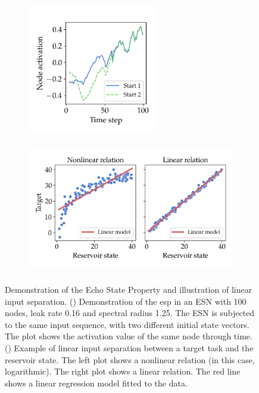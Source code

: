 \begin{figure}
    \centering
    \begin{subfigure}[b]{0.35\linewidth}
        \centering
        \includegraphics[height=5.7cm,keepaspectratio]{img/explainer_fading_mem.png}
        \caption{ }
        \label{fig:fading_mem_principle}
    \end{subfigure}
    \hfill
    \begin{subfigure}[b]{0.62\linewidth}
        \centering
        \includegraphics[height=5.7cm,keepaspectratio]{img/explainer_input_sep.png}
        \caption{ }
        \label{fig:input_sep_principle}
    \end{subfigure}
    \caption[Demonstration of the Echo State Property and illustration of linear input separation.]{
        Demonstration of the Echo State Property and illustration of linear input separation.
        () Demonstration of the \acrlong{esp} in an ESN with 100 nodes, leak rate 0.16 and spectral radius 1.25. The ESN is subjected to the same input sequence, with two different initial state vectors. The plot shows the activation value of the same node through time.
        () Example of linear input separation between a target task and the reservoir state. The left plot shows a nonlinear relation (in this case, logarithmic). The right plot shows a linear relation. The red line shows a linear regression model fitted to the data.
    }
    \label{fig:prc_principles}
\end{figure}

